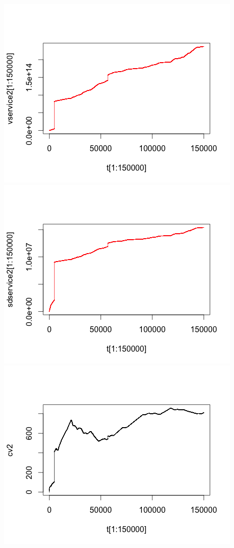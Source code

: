 \documentclass[11pt]{article}
\begin{document}
\includegraphics[scale=0.5]{vservice2.png} \\
\includegraphics[scale=0.5]{SDservice2.png}
\includegraphics[scale=0.5]{CVservice2.png} \\
\end{document}
